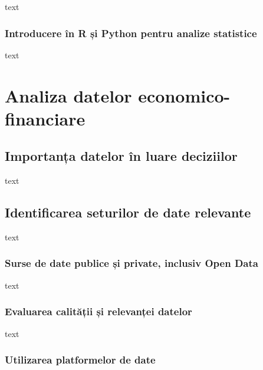 \documentclass[
  11pt,
  b5paper,
  nottoc]{book}
\begin{document}
text

\hypertarget{introducere-uxeen-r-ux219i-python-pentru-analize-statistice-1}{%
\subsection{Introducere în R și Python pentru analize
statistice}\label{introducere-uxeen-r-ux219i-python-pentru-analize-statistice-1}}

text


\hypertarget{cap3}{%
\chapter{Analiza datelor economico-financiare}\label{cap3}}

\hypertarget{importanux21ba-datelor-uxeen-luare-deciziilor-2}{%
\section{Importanța datelor în luare
deciziilor}\label{importanux21ba-datelor-uxeen-luare-deciziilor-2}}

text

\hypertarget{identificarea-seturilor-de-date-relevante-2}{%
\section{Identificarea seturilor de date
relevante}\label{identificarea-seturilor-de-date-relevante-2}}

text

\hypertarget{surse-de-date-publice-ux219i-private-inclusiv-open-data-2}{%
\subsection{Surse de date publice și private, inclusiv Open
Data}\label{surse-de-date-publice-ux219i-private-inclusiv-open-data-2}}

text

\hypertarget{evaluarea-calitux103ux21bii-ux219i-relevanux21bei-datelor-2}{%
\subsection{Evaluarea calității și relevanței
datelor}\label{evaluarea-calitux103ux21bii-ux219i-relevanux21bei-datelor-2}}

text

\hypertarget{utilizarea-platformelor-de-date-2}{%
\subsection{Utilizarea platformelor de
date}\label{utilizarea-platformelor-de-date-2}}
\end{document}
